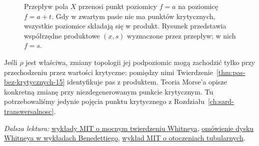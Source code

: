 \begin{figure}[htbp]
\centering
{}
\caption{Przepływ pola $X$ przenosi punkt poziomicy
$f=a$ na poziomicę $f=a+t$. Gdy w zwartym pasie
nie ma punktów krytycznych, wszystkie poziomice
składają się w produkt. Rysunek przedstawia współrzędne
produktowe $(x,s)$ wyznaczone przez przepływ; w nich $f=s$.}
\label{fig:pas-bez-krytycznych-15}
\end{figure}

\begin{uwaga}
Jeśli $\rho$ jest właściwa,
zmiany topologii jej podpoziomic
mogą zachodzić tylko przy
przechodzeniu przez wartości
krytyczne: pomiędzy nimi
Twierdzenie~\ref{thm:pas-bez-krytycznych-15}
identyfikuje pas z produktem.
Teoria Morse'a opisze
konkretną zmianę przy
niezdegenerowanym punkcie
krytycznym. Tu potrzebowaliśmy
jedynie pojęcia punktu
krytycznego z Rozdziału~\ref{ch:sard-transwersalnosc}.
\end{uwaga}

\par\smallskip
{\footnotesize\noindent\emph{Dalsza lektura:}
\href{https://ocw.mit.edu/courses/18-965-geometry-of-manifolds-fall-2004/d0598b3b5ced2d2d0a9884ee14abeae3_lecture21_22.pdf}{wykłady MIT o mocnym twierdzeniu Whitneya},
\href{https://arxiv.org/pdf/1907.10297}{omówienie dysku Whitneya w wykładach Benedettiego},
\href{https://ocw.mit.edu/courses/18-966-geometry-of-manifolds-spring-2007/238234d53148cb71c5880e529a96c73f_lect05.pdf}{wykład MIT o otoczeniach tubularnych}.\par}
